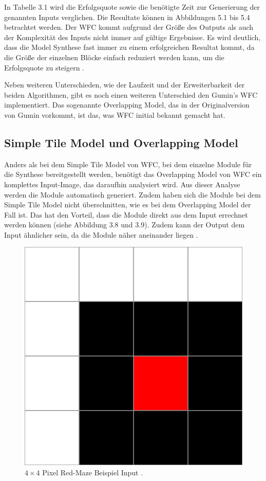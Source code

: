 \documentclass[12pt, a4paper,twoside,openany]{report} %
\begin{document}
In Tabelle 3.1 wird die Erfolgsquote sowie die benötigte Zeit zur Generierung der genannten Inputs verglichen.
Die Resultate können in Abbildungen 5.1 bis 5.4 betrachtet werden.
Der WFC kommt aufgrund der Größe des Outputs als auch der Komplexität des Inputs nicht immer auf gültige Ergebnisse.
Es wird deutlich, dass die Model Synthese fast immer zu einem erfolgreichen Resultat kommt,
da die Größe der einzelnen Blöcke einfach reduziert werden kann, um die Erfolgsquote zu steigern \cite{merrell2018compare}.\par

Neben weiteren Unterschieden, wie der Laufzeit und der Erweiterbarkeit der beiden Algorithmen, gibt es noch einen weiteren Unterschied den Gumin's WFC implementiert.
Das sogenannte Overlapping Model, das in der Originalversion von Gumin vorkommt, ist das, was WFC initial bekannt gemacht hat.

\pagebreak

\subsection{Simple Tile Model und Overlapping Model}

Anders als bei dem Simple Tile Model von WFC, bei dem einzelne Module für die Synthese bereitgestellt werden,
benötigt das Overlapping Model von WFC ein komplettes Input-Image, das daraufhin analysiert wird.
Aus dieser Analyse werden die Module automatisch generiert.
Zudem haben sich die Module bei dem Simple Tile Model nicht überschnitten, wie es bei dem Overlapping Model der Fall ist.
Das hat den Vorteil, dass die Module direkt aus dem Input errechnet werden können {(siehe Abbildung 3.8 und 3.9)}.
Zudem kann der Output dem Input ähnlicher sein, da die Module näher aneinander liegen \cite{merrell2018compare}.

\begin{figure}[H]
    \centering
    \includegraphics[width=0.5\linewidth]{images/red-maze.jpg}%
    \caption{$4\times 4$ Pixel Red-Maze Beispiel Input \cite{Karth2017WaveFunctionCollapseIC}.}%
\end{figure}
\end{document}
